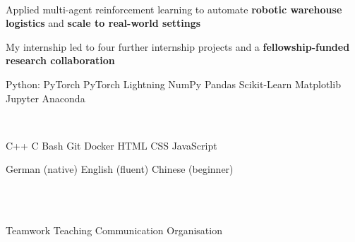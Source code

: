 \documentclass[]{lukas-cv-openfont}
\begin{document}
\noindent
{}
\\
\begin{tightitemize}{1.7em}
\item Applied multi-agent reinforcement learning to automate \textbf{robotic warehouse logistics} and \textbf{scale to real-world settings}~\cite{krnjaic2022scalable}
\item My internship led to four further internship projects and a \textbf{fellowship-funded research collaboration}
\end{tightitemize}
\largesectionsep


\newpage

\vspace{-0.7em}
\begin{multicols}{2}
    \raggedright
    \setlength{\columnsep}{1.5cm}
    \setlength{\columnseprule}{0.2pt}
    \noindent

    \begin{skillblock}
        Python: PyTorch \textbullet{} PyTorch Lightning \textbullet{} NumPy \textbullet{} Pandas \textbullet{} Scikit-Learn \textbullet{} Matplotlib \textbullet{} Jupyter \textbullet{} Anaconda
    \end{skillblock}

    \ \\

    \begin{skillblock}
        C++ \textbullet{} C \textbullet{} Bash \textbullet{} Git \textbullet{} Docker \textbullet{} HTML \textbullet{} CSS \textbullet{} JavaScript
    \end{skillblock}

    \raggedleft

    \begin{skillblock}
        German (native) \textbullet{} English (fluent) \textbullet{} Chinese (beginner)
    \end{skillblock}

    \ \\
    \ \\

    \begin{skillblock}
        Teamwork \textbullet{} Teaching \textbullet{} Communication \textbullet{} Organisation
    \end{skillblock}
\end{multicols}
\largesectionsep
\end{document}

